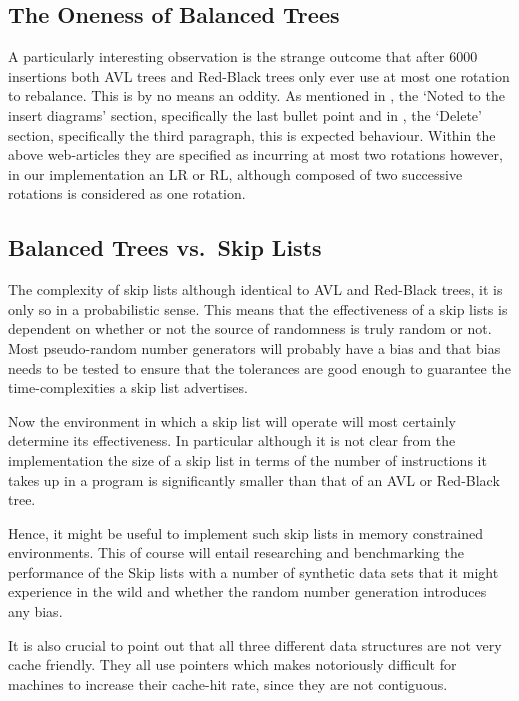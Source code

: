 \documentclass[article]{uom-coursework}
\begin{document}
\subsection{The Oneness of Balanced Trees}

A particularly interesting observation is the strange outcome
that after 6000 insertions both AVL trees and Red-Black trees
only ever use at most one rotation to rebalance. This is by no
means an oddity. As mentioned in \textcite{wikirbtree}, the
`Noted to the insert diagrams' section, specifically the last
bullet point and in \textcite{wikiavltree}, the `Delete'
section, specifically the third paragraph, this is expected
behaviour. Within the above web-articles they are specified as
incurring at most two rotations however, in our implementation
an LR or RL, although composed of two successive rotations is
considered as one rotation.

\subsection{Balanced Trees vs.\ Skip Lists}

The complexity of skip lists although identical to AVL and
Red-Black trees, it is only so in a probabilistic sense. This
means that the effectiveness of a skip lists is dependent on
whether or not the source of randomness is truly random or not.
Most pseudo-random number generators will probably have a bias
and that bias needs to be tested to ensure that the tolerances
are good enough to guarantee the time-complexities a skip list
advertises.

Now the environment in which a skip list will operate will most
certainly determine its effectiveness. In particular although it
is not clear from the implementation the size of a skip list in
terms of the number of instructions it takes up in a program is
significantly smaller than that of an AVL or Red-Black tree.

Hence, it might be useful to implement such skip lists in memory
constrained environments. This of course will entail researching
and benchmarking the performance of the Skip lists with a number
of synthetic data sets that it might experience in the wild and
whether the random number generation introduces any bias.

It is also crucial to point out that all three different data
structures are not very cache friendly. They all use pointers
which makes notoriously difficult for machines to increase their
cache-hit rate, since they are not contiguous.
\end{document}
